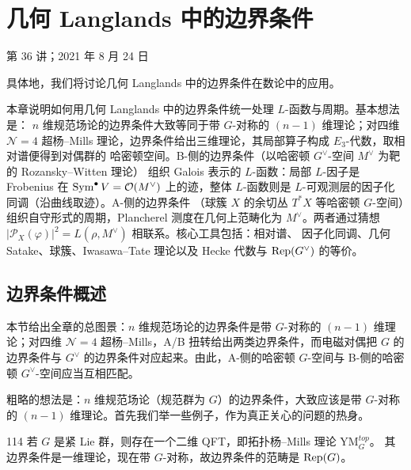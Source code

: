 \chapter{几何 Langlands 中的边界条件}\label{ch:17}

\begin{flushright}
\small 第 36 讲；2021 年 8 月 24 日
\end{flushright}

具体地，我们将讨论几何 Langlands 中的边界条件在数论中的应用。

\begin{keytakeaways}
本章说明如何用几何 Langlands 中的边界条件统一处理 $L$-函数与周期。基本想法是：
$n$ 维规范场论的边界条件大致等同于带 $G$-对称的 $(n-1)$ 维理论；对四维 $\mathcal N=4$
超杨--Mills 理论，边界条件给出三维理论，其局部算子构成 $E_3$-代数，取相对谱便得到对偶群的
哈密顿空间。B-侧的边界条件（以哈密顿 $G^{\vee}$-空间 $M^{\vee}$ 为靶的 Rozansky--Witten 理论）
组织 Galois 表示的 $L$-函数：局部 $L$-因子是 Frobenius 在 $\operatorname{Sym}^{\bullet}V=\mathcal{O}(M^{\vee})$
上的迹，整体 $L$-函数则是 $L$-可观测层的因子化同调（沿曲线取迹）。A-侧的边界条件
（球簇 $X$ 的余切丛 $T^*X$ 等哈密顿 $G$-空间）组织自守形式的周期，Plancherel 测度在几何上范畴化为
$M^{\vee}$。两者通过猜想 $|\mathcal{P}_X(\varphi)|^2=L(\rho,M^{\vee})$ 相联系。核心工具包括：相对谱、
因子化同调、几何 Satake、球簇、Iwasawa--Tate 理论以及 Hecke 代数与 $\mathrm{Rep}(G^{\vee})$ 的等价。
\end{keytakeaways}

\section{边界条件概述}

\begin{sectionkey}
本节给出全章的总图景：$n$ 维规范场论的边界条件是带 $G$-对称的 $(n-1)$ 维理论；对四维
$\mathcal N=4$ 超杨--Mills，A/B 扭转给出两类边界条件，而电磁对偶把 $G$ 的边界条件与
$G^{\vee}$ 的边界条件对应起来。由此，A-侧的哈密顿 $G$-空间与 B-侧的哈密顿 $G^{\vee}$-空间应当互相匹配。
\end{sectionkey}

粗略的想法是：$n$ 维规范场论（规范群为 $G$）的边界条件，大致应该是带 $G$-对称的
$(n-1)$ 维理论。首先我们举一些例子，作为真正关心的问题的热身。

\begin{srcex}{114}
若 $G$ 是紧 Lie 群，则存在一个二维 QFT，即拓扑杨--Mills 理论 $\mathrm{YM}^{top}_G$。
其边界条件是一维理论，现在带 $G$-对称，故边界条件的范畴是 $\mathrm{Rep}(G)$。
\end{srcex}

